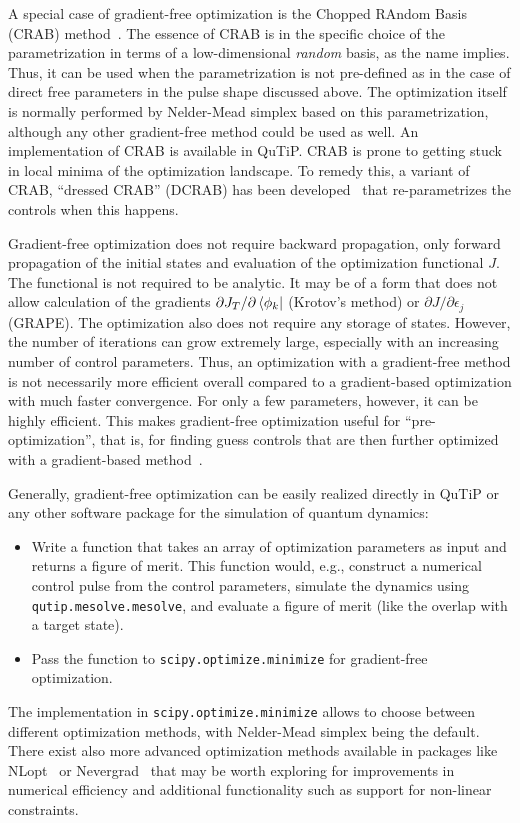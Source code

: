 \documentclass[submission, Phys]{SciPost}
\begin{document}
A special case of gradient-free optimization is the Chopped RAndom Basis (CRAB)
method~\cite{DoriaPRL11,CanevaPRA2011}.
The essence of CRAB is in the specific choice of the parametrization in terms of
a low-dimensional \emph{random} basis, as the name implies.
Thus, it can be used when the parametrization is not pre-defined as in the case
of direct free parameters in the pulse shape discussed above.
The optimization itself is normally performed by Nelder-Mead simplex based on
this parametrization, although any other gradient-free method could be used as
well.
An implementation of CRAB is available in QuTiP. CRAB is prone to getting stuck
in local minima of the optimization landscape.
To remedy this, a variant of CRAB, ``dressed CRAB'' (DCRAB) has been
developed~\cite{RachPRA2015} that re-parametrizes the controls when this
happens.

Gradient-free optimization does not require backward propagation, only forward
propagation of the initial states and evaluation of the optimization functional
$J$.
The functional is not required to be analytic.
It may be of a form that does not allow calculation of the gradients \(\partial
J_T / \partial \bra{\phi_k}\) (Krotov's method) or \(\partial J / \partial
\epsilon_j\) (GRAPE). The optimization also does not require  any storage of
states.
However, the number of iterations can grow extremely large, especially with an
increasing number of control parameters.
Thus, an optimization with a gradient-free method is not necessarily more
efficient overall compared to a gradient-based optimization with much faster
convergence.
For only a few parameters, however, it can be highly efficient.
This makes gradient-free optimization useful for ``pre-optimization'', that is,
for finding guess controls that are then further optimized with a gradient-based
method~\cite{GoerzEPJQT2015}.

Generally, gradient-free optimization can be easily realized directly in QuTiP
or any other software package for the simulation of quantum dynamics:
\begin{itemize}
  \item
    Write a function that takes an array of optimization parameters as input and
    returns a figure of merit.  This function would, e.g., construct a numerical
    control pulse from the control parameters, simulate the dynamics using {\tt
    qutip.mesolve.mesolve}, and evaluate a figure of merit (like the overlap
    with a target state).
  \item
    Pass the function to {\tt scipy.optimize.minimize} for gradient-free
    optimization.
\end{itemize}
The implementation in {\tt scipy.optimize.minimize} allows to choose between
different optimization methods, with Nelder-Mead simplex being the default.
There exist also more advanced optimization methods available in packages like
NLopt~\cite{NLOpt} or Nevergrad~\cite{nevergrad} that may be worth exploring for
improvements in numerical efficiency and additional functionality such as
support for non-linear constraints.
\end{document}
